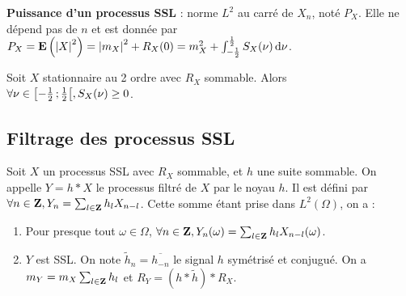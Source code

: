 	\begin{defn}
	\textbf{Puissance d'un processus SSL} : norme $L^2$ au carré de $X_n$, noté $P_X$.
	Elle ne dépend pas de $n$ et est donnée par $P_X = \mathbf{E} \left( \left\lvert X\right\rvert^2 \right) = \left\lvert m_X\right\rvert^2 + R_X(0) = m_X^2 + \int_{-\frac{1}{2}}^{\frac{1}{2}} S_X(\nu) \mathop{}\mathopen{}\mathrm{d} \nu$.
	\end{defn}
	
	\begin{pop}
		Soit $X$ stationnaire au 2 ordre avec $R_X$ sommable.
		Alors $\forall \nu \in \mathopen{}\mathclose{\left[-\frac{1}{2}\mathclose{}\mathpunct{};\frac{1}{2}\right[}, S_X(\nu) \geq 0$.
	\end{pop}

\subsection{Filtrage des processus SSL}

	\begin{pop}
		Soit $X$ un processus SSL avec $R_X$ sommable, et $h$ une suite sommable.
		On appelle $Y = h * X$ le processus filtré de $X$ par le noyau $h$.
		Il est défini par $\forall n \in \mathbf{Z}, Y_n = \sum_{l \in \mathbf{Z}} h_l X_{n - l}$.
		Cette somme étant prise dans $L^2(\Omega)$, on a :
		\begin{enumerate}
		\item
			Pour presque tout $\omega \in \Omega$, $\forall n \in \mathbf{Z}, Y_n(\omega) = \sum_{l \in \mathbf{Z}} h_l X_{n - l}(\omega)$.
		\item
			$Y$ est SSL. On note $\tilde{h}_n = \overline{h_{-n}}$ le signal $h$ symétrisé et conjugué.
			On a $m_Y = m_X \sum_{l \in \mathbf{Z}} h_l$ et $R_Y = (h * \tilde{h}) * R_X$.
		\end{enumerate}
	\end{pop}